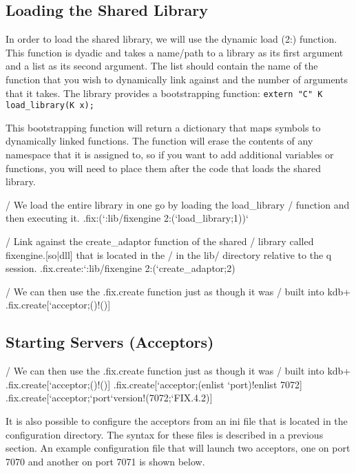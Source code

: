 \subsection{Loading the Shared Library}
In order to load the shared library, we will use the dynamic load (2:) function. This function is dyadic
and takes a name/path to a library as its first argument and a list as its second argument. The list should
contain the name of the function that you wish to dynamically link against and the number of arguments that
it takes. The library provides a bootstrapping function: \texttt{extern "C" K load_library(K x);}

This bootstrapping function will return a dictionary that maps symbols to dynamically linked functions. The
function will erase the contents of any namespace that it is assigned to, so if you want to add additional
variables or functions, you will need to place them after the code that loads the shared library.


\begin{qcode}
/ We load the entire library in one go by loading the load_library
/ function and then executing it.
.fix:(`:lib/fixengine 2:(`load_library;1))`
\end{qcode}

\begin{qcode}
/ Link against the create_adaptor function of the shared
/ library called fixengine.[so|dll] that is located in the
/ in the lib/ directory relative to the q session.
.fix.create:`:lib/fixengine 2:(`create_adaptor;2)

/ We can then use the .fix.create function just as though it was
/ built into kdb+
.fix.create[`acceptor;()!()]
\end{qcode}

\subsection{Starting Servers (Acceptors)}

\begin{qcode}
/ We can then use the .fix.create function just as though it was
/ built into kdb+
.fix.create[`acceptor;()!()]
.fix.create[`acceptor;(enlist `port)!enlist 7072]
.fix.create[`acceptor;`port`version!(7072;`FIX.4.2)]
\end{qcode}

It is also possible to configure the acceptors from an ini file that is located in the configuration directory. The syntax for these files is described in a previous section.
An example configuration file that will launch two acceptors, one on port 7070 and another
on port 7071 is shown below.

